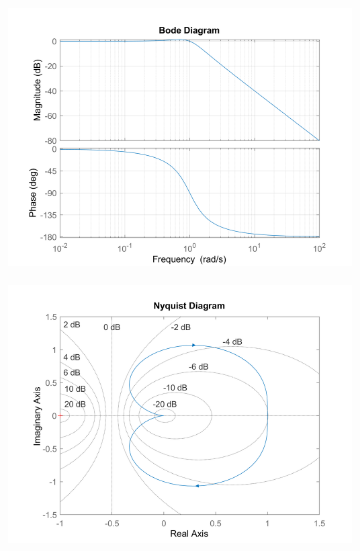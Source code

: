 \documentclass{article}
\begin{document}
\begin{figure}[H] %
    \centering
    \begin{subfigure}{0.45\textwidth}
        \centering
        \includegraphics[width=\textwidth]{figures/bode_G.png}
        \caption{}
        \label{fig:bode_G}
    \end{subfigure}
    \begin{subfigure}{0.45\textwidth}
        \centering
        \includegraphics[width=\textwidth]{figures/nyquist_G.png}
        \caption{}
        \label{fig:nyquist_G}
    \end{subfigure}
    \caption{}
\end{figure}
\end{document}
